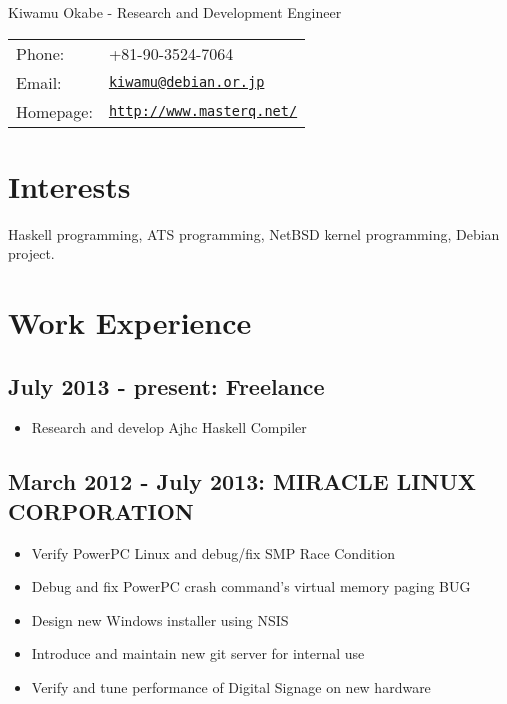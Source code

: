 \documentclass[letterpaper]{article}
\def\name{Kiwamu Okabe - Research and Development Engineer}
\begin{document}
{\huge \name}


\vspace{0.25in}

\begin{minipage}{0.3\linewidth}
  \begin{tabular}{ll}
    Phone: & +81-90-3524-7064 \\
    Email: & \href{mailto:kiwamu@debian.or.jp}{\tt kiwamu@debian.or.jp} \\
    Homepage: & \href{http://www.masterq.net/}{\tt http://www.masterq.net/} \\
  \end{tabular}
\end{minipage}

\section*{Interests}

Haskell programming, ATS programming, NetBSD kernel programming, Debian project.

\section*{Work Experience}
\subsection*{July 2013 - present: Freelance}

\begin{itemize}
  \item Research and develop Ajhc Haskell Compiler
\end{itemize}

\subsection*{March 2012 - July 2013: MIRACLE LINUX CORPORATION}

\begin{itemize}
  \item Verify PowerPC Linux and debug/fix SMP Race Condition
  \item Debug and fix PowerPC crash command's virtual memory paging BUG
  \item Design new Windows installer using NSIS
  \item Introduce and maintain new git server for internal use
  \item Verify and tune performance of Digital Signage on new hardware
\end{itemize}
\end{document}
